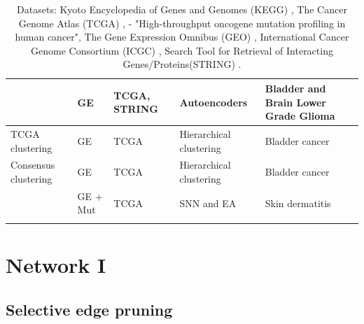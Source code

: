 \begin{appendices}
{\begin{longtable}{|p{3cm}|p{1.8cm}|p{2.2cm}|p{2.8cm}|p{3.5cm}|}
\citet{Ma2019-hk} & GE & TCGA, STRING & Autoencoders &  Bladder and Brain Lower Grade Glioma \\ \hline
TCGA clustering & GE & TCGA & Hierarchical clustering & Bladder cancer  \\ \hline
Consensus clustering & GE & TCGA & Hierarchical clustering & Bladder cancer \\ \hline
\citet{Capecci2020-uj} & GE + Mut & TCGA & SNN and EA & Skin dermatitis  \\ \hline
\caption{Datasets: Kyoto Encyclopedia of Genes and Genomes (KEGG) \cite{Kanehisa2017-wj}, The Cancer Genome Atlas (TCGA) \cite{Tcga2018-sj}, \citet{Thomas2007-yj} - "High-throughput oncogene mutation profiling in human cancer", The Gene Expression Omnibus (GEO) \cite{Clough2016-zc, Davis2007-at}, International Cancer Genome Consortium (ICGC) \cite{International_Cancer_Genome_Consortium2010-ca}, Search Tool for Retrieval of Interacting Genes/Proteins(STRING) \cite{Szklarczyk2019-pu}.}
\label{tab:approaches}
\end{longtable}
}








\section{Network I}

\subsection{Selective edge pruning} \label{s:ap:sel_prun}


\end{appendices}
